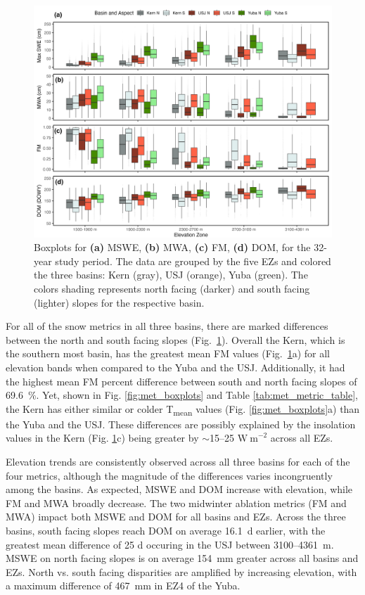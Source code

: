\begin{figure}[t]
\includegraphics[width=\textwidth]{figures/ch2_figs/snow4_boxplot_v5.png}
\caption{Boxplots for \textbf{(a)} MSWE, \textbf{(b)} MWA, \textbf{(c)} FM, \textbf{(d)} DOM, for the 32-year study period. The data are grouped by the five EZs and colored the three basins: Kern (gray), USJ (orange), Yuba (green). The colors shading represents north facing (darker) and south facing (lighter) slopes for the respective basin.}
\label{fig:snow_boxplots}
\end{figure}


For all of the snow metrics in all three basins, there are marked differences between the north and south facing slopes (Fig.~\ref{fig:snow_boxplots}). Overall the Kern, which is the southern most basin, has the greatest mean FM values (Fig.~\ref{fig:snow_boxplots}a) for all elevation bands when compared to the Yuba and the USJ. Additionally, it had the highest mean FM percent difference between south and north facing slopes of 69.6~\%. Yet, shown in Fig. \ref{fig:met_boxplots} and Table \ref{tab:met_metric_table}, the Kern has either similar or colder T\textsubscript{mean} values (Fig. \ref{fig:met_boxplots}a) than the Yuba and the USJ. These differences are possibly explained by the insolation values in the Kern (Fig. \ref{fig:snow_boxplots}c) being greater by $\sim$15--25 $\mathrm{W~m}^{-2}$ across all EZs. 

Elevation trends are consistently observed across all three basins for each of the four metrics, although the magnitude of the differences varies incongruently among the basins. As expected, MSWE and DOM increase with elevation, while FM and MWA broadly decrease. The two midwinter ablation metrics (FM and MWA) impact both MSWE and DOM for all basins and EZs. Across the three basins, south facing slopes reach DOM on average 16.1~d earlier, with the greatest mean difference of 25 d occuring in the USJ between 3100--4361~m. MSWE on north facing slopes is on average 154~mm greater across all basins and EZs. North vs. south facing disparities are amplified by increasing elevation, with a maximum difference of 467~mm in EZ4 of the Yuba.

